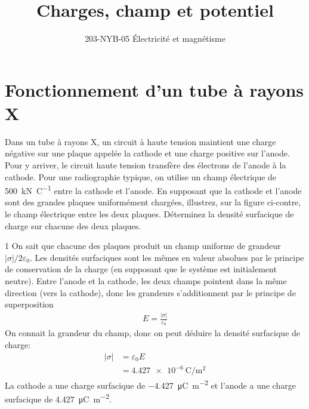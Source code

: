 \documentclass{tufte-handout}
\title{Charges, champ et potentiel}
\date{}
\author{203-NYB-05 Électricité et magnétisme}
\newcommand{\abs}[1]{\left| #1 \right|}
\def\reponse{0}
\begin{document}
\maketitle


\section{Fonctionnement d'un tube à rayons X}

Dans un tube à rayons X, un circuit à haute tension maintient une charge
négative sur une plaque appelée la cathode et une charge positive sur l'anode.
Pour y arriver, le circuit haute tension transfère des électrons de l'anode à
la cathode. Pour une radiographie typique, on utilise un champ électrique de
\SI{500}{\kilo\newton\per\coulomb} entre la cathode et l'anode. En supposant
que la cathode et l'anode sont des grandes plaques uniformément chargées,
illustrez, sur la figure ci-contre, le champ électrique entre les deux plaques.
Déterminez la densité surfacique de charge sur chacune des deux plaques.

\begin{marginfigure}
  \begin{center}
  \end{center}
\end{marginfigure}

\if\reponse1
  {\color{tblue}
    On sait que chacune des plaques produit un champ uniforme de grandeur
    $\abs{\sigma} / 2\varepsilon_0$. Les densités surfaciques sont les mêmes en
    valeur absolues par le principe de conservation de la charge (en supposant
    que le système est initialement neutre). Entre l'anode et la cathode, les
    deux champs pointent dans la même direction (vers la cathode), donc les
    grandeurs s'additionnent par le principe de superposition
    \begin{align*}
      E = \frac{\abs{\sigma}}{\varepsilon_0}
    \end{align*}
    On connait la grandeur du champ, donc on peut déduire la densité surfacique
    de charge:
    \begin{align*}
      \abs{\sigma} &= \varepsilon_0 E  \\
                   &= \SI{4.427e-6}{\coulomb\per\meter\squared}
    \end{align*}
    La cathode a une charge surfacique de
    \SI{-4.427}{\micro\coulomb\per\meter\squared} et l'anode a une charge
    surfacique de \SI{4.427}{\micro\coulomb\per\meter\squared}.
  }
\else
  \vspace{5cm}
\fi
\end{document}
